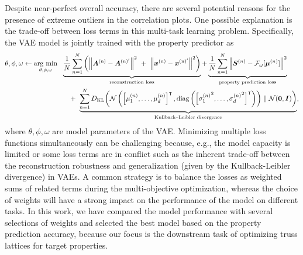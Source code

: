 \documentclass[fleqn,10pt]{wlscirep}
\newcommand{\boldface}[1]{\boldsymbol{#1}}
\newcommand{\bfx}{\boldface{x}}
\newcommand{\bfA}{\boldface{A}}
\newcommand{\bfI}{\boldface{I}}
\newcommand{\bfS}{\boldface{S}}
\newcommand{\bfmu}{\boldsymbol{\mu}}
\newcommand{\calF}{\mathcal{F}}
\newcommand{\calN}{\mathcal{N}}
\newcommand{\be}{\begin{equation}}
\newcommand{\ee}{\end{equation}}
\newcommand{\argminWithArgs}{\operatornamewithlimits{arg\ min}}
\begin{document}
Despite near-perfect overall accuracy, there are several potential reasons for the presence of extreme outliers in the correlation plots. One possible explanation is the trade-off between loss terms in this multi-task learning problem. Specifically, the VAE model is jointly trained with the property predictor as
\be\label{eq:total-loss}
\begin{aligned}
\theta,\phi,\omega \leftarrow \argminWithArgs_{\theta,\phi,\omega} \ \ 
&  
\underbrace{
\frac{1}{N}\sum_{n=1}^N \left(\left\|\bfA^\text{(n)} - \bfA^{\text{(n)}'} \right\|^2  
\ +\  
\left\|\bfx^\text{(n)} - \bfx^{\text{(n)}'} \right\|^2 \right) 
}_\text{reconstruction loss}
 + 
\underbrace{
 \frac{1}{N}\sum_{n=1}^N \left\|\bfS^{(n)} - \calF_\omega[\bfmu^{(n)}] \right\|^2  
 }_\text{property prediction loss}\\
 &
\quad +\ 
\underbrace{
\sum_{n=1}^N D_\text{KL}\bigg(\calN\left(\left[\mu_1^{(n)},\dots,\mu_d^{(n)}\right]^\intercal,\text{diag}\left(\left[{\sigma_1^{(n)}}^2,\dots,{\sigma_d^{(n)}}^2\right]^\intercal\right)\right) \parallel \calN(\boldsymbol{0},\bfI) \bigg)
}_\text{Kullback–Leibler divergence}, \\
\end{aligned}
\ee
where $\theta,\phi,\omega$ are model parameters of the VAE. Minimizing multiple loss functions simultaneously can be challenging because, e.g., the model capacity is limited or some loss terms are in conflict such as the inherent trade-off between the reconstruction robustness and generalization (given by the Kullback-Leibler divergence) in VAEs. A common strategy is to balance the losses as weighted sums of related terms during the multi-objective optimization, whereas the choice of weights will have a strong impact on the performance of the model on different tasks. In this work, we have compared the model performance with several selections of weights and selected the best model based on the property prediction accuracy, because our focus is the downstream task of optimizing truss lattices for target properties. 
\end{document}
